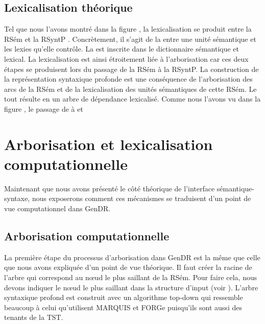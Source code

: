\subsection{Lexicalisation théorique}
Tel que nous l'avons montré dans la figure , la lexicalisation se produit entre la RSém et la RSyntP \citep{PolguereStructurationmisejeu1990}. Concrètement, il s'agit de la  entre une unité sémantique et les lexies qu'elle contrôle. La  est inscrite dans le dictionnaire sémantique et lexical. La lexicalisation est ainsi étroitement liée à l'arborisation car ces deux étapes se produisent lors du passage de la RSém à la RSyntP. La construction de la représentation syntaxique profonde est une conséquence de l'arborisation des arcs de la RSém et de la lexicalisation des unités sémantiques de cette RSém. Le tout résulte en un arbre de dépendance lexicalisé. Comme nous l'avons vu dans la figure , le passage de  à  et  



\section{Arborisation et lexicalisation computationnelle}\label{secarbolex}

Maintenant que nous avons présenté le côté théorique de l'interface sémantique-syntaxe, nous exposerons comment ces mécanismes se traduisent d'un point de vue computationnel dans GenDR.

\subsection{Arborisation computationnelle}
La première étape du processus d'arborisation dans GenDR est la même que celle que nous avons expliquée d'un point de vue théorique. Il faut créer la racine de l'arbre qui correspond au n\oe{}ud le plus saillant de la RSém. Pour faire cela, nous devons indiquer le n\oe{}ud le plus saillant dans la structure d'input (voir ). L'arbre syntaxique profond est construit avec un algorithme top-down qui ressemble beaucoup à celui qu'utilisent MARQUIS et FORGe puisqu'ils sont aussi des tenants de la TST.

